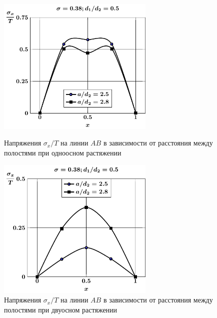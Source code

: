 \begin{figure}[h!]
\centering\footnotesize
\parbox[b]{7.5cm}{\centering\includegraphics[width=7.5cm]{periodic-oblate-cav27-a-d50-t1-sig_x.pdf}
\caption{Напряжения $\sigma_x/T$ на линии $AB$ в зависимости от расстояния между полостями при одноосном растяжении
\label{f:11:35}}}\hfil\hfil
\parbox[b]{7.5cm}{\centering\includegraphics[width=7.5cm]{periodic-oblate-cav27-a-d50-t2-sig_x.pdf}
\caption{Напряжения $\sigma_x/T$ на линии $AB$ в зависимости от расстояния между полостями при двуосном растяжении
\label{f:11:36}}}
\end{figure}

